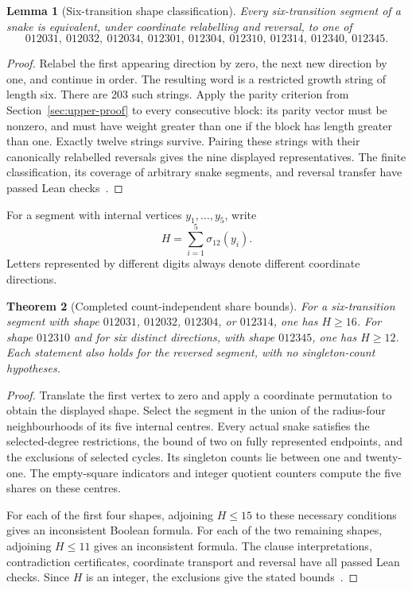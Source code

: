 \documentclass[11pt,a4paper]{article}
\newtheorem{theorem}{Theorem}[section]
\newtheorem{lemma}[theorem]{Lemma}
\theoremstyle{definition}
\theoremstyle{remark}
\begin{document}
\begin{lemma}[Six-transition shape classification]\label{lem:six-shape-classification}
Every six-transition segment of a snake is equivalent, under coordinate relabelling and reversal, to one of
\[
012031,\ 012032,\ 012034,\ 012301,\ 012304,\
012310,\ 012314,\ 012340,\ 012345.
\]
\end{lemma}
\begin{proof}
Relabel the first appearing direction by zero, the next new direction by one, and continue in order. The resulting word is a restricted growth string of length six. There are 203 such strings. Apply the parity criterion from Section~\ref{sec:upper-proof} to every consecutive block: its parity vector must be nonzero, and must have weight greater than one if the block has length greater than one. Exactly twelve strings survive. Pairing these strings with their canonically relabelled reversals gives the nine displayed representatives. The finite classification, its coverage of arbitrary snake segments, and reversal transfer have passed Lean checks~\cite{countfreearchive}.
\end{proof}

For a segment with internal vertices $y_1,\ldots,y_5$, write
\[
H=\sum_{i=1}^{5}\sigma_{12}(y_i).
\]
Letters represented by different digits always denote different coordinate directions.

\begin{theorem}[Completed count-independent share bounds]\label{thm:countfree-completed}
For a six-transition segment with shape $012031$, $012032$, $012304$, or $012314$, one has $H\ge16$. For shape $012310$ and for six distinct directions, with shape $012345$, one has $H\ge12$. Each statement also holds for the reversed segment, with no singleton-count hypotheses.
\end{theorem}
\begin{proof}
Translate the first vertex to zero and apply a coordinate permutation to obtain the displayed shape. Select the segment in the union of the radius-four neighbourhoods of its five internal centres. Every actual snake satisfies the selected-degree restrictions, the bound of two on fully represented endpoints, and the exclusions of selected cycles. Its singleton counts lie between one and twenty-one. The empty-square indicators and integer quotient counters compute the five shares on these centres.

For each of the first four shapes, adjoining $H\le15$ to these necessary conditions gives an inconsistent Boolean formula. For each of the two remaining shapes, adjoining $H\le11$ gives an inconsistent formula. The clause interpretations, contradiction certificates, coordinate transport and reversal have all passed Lean checks. Since $H$ is an integer, the exclusions give the stated bounds~\cite{countfreearchive,shareclosurearchive,share152archive}.
\end{proof}
\end{document}
